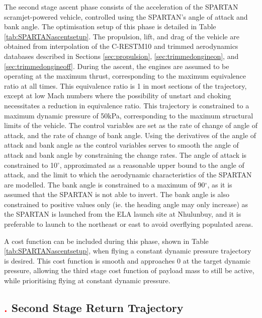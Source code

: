 The second stage ascent phase consists of the acceleration of the SPARTAN scramjet-powered vehicle, controlled using the SPARTAN's angle of attack and bank angle. The optimisation setup of this phase is detailed in Table \ref{tab:SPARTANascentsetup}.
The propulsion, lift, and drag of the vehicle are obtained from interpolation of the C-RESTM10 and trimmed aerodynamics databases described in Sections \ref{sec:propulsion}, \ref{sec:trimmedongineon}, and \ref{sec:trimmedongineoff}. 
During the ascent, the engines are assumed to be operating at the maximum thrust, corresponding to the maximum equivalence ratio at all times. This equivalence ratio is 1 in most sections of the trajectory, except at low Mach numbers where the possibility of unstart and choking necessitates a reduction in equivalence ratio. This trajectory is constrained to a maximum dynamic pressure of 50kPa, corresponding to the maximum structural limits of the vehicle. 
The control variables are set as the rate of change of angle of attack, and the rate of change of bank angle. Using the derivatives of the angle of attack and bank angle as the control variables serves to smooth the angle of attack and bank angle by constraining the change rates. The angle of attack is constrained to 10$^\circ$, approximated as a reasonable upper bound to the angle of attack, and the limit to which the aerodynamic characteristics of the SPARTAN are modelled. The bank angle is constrained to a maximum of 90$^\circ$, as it is assumed that the SPARTAN is not able to invert. The bank angle is also constrained to positive values only (ie. the heading angle may only increase) as the SPARTAN is launched from the ELA launch site at Nhulunbuy, and it is preferable to launch to the northeast or east to avoid overflying populated areas. 

A cost function can be included during this phase, shown in Table \ref{tab:SPARTANascentsetup}, when flying a constant dynamic pressure trajectory is desired. This cost function is smooth and approaches 0 at the target dynamic pressure, allowing the third stage cost function of payload mass to still be active, while prioritising flying at constant dynamic pressure. 


\subsection{\textcolor{red}{.} Second Stage Return Trajectory}

